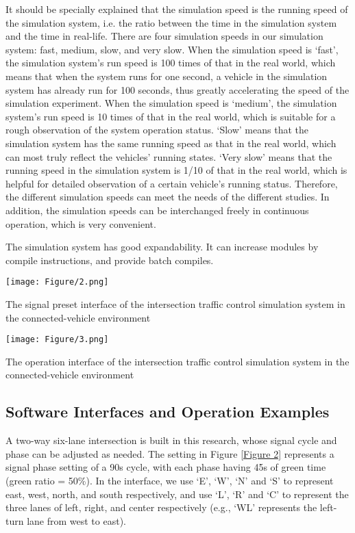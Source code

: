 \documentclass[10.5pt,compsoc]{TsT}
\theoremstyle{mystyle}
\begin{document}
{It should be specially explained that the simulation speed is the
running speed of the simulation system, i.e. the ratio between the time
in the simulation system and the time in real-life. There are four
simulation speeds in our simulation system: fast, medium, slow, and very
slow. When the simulation speed is `fast', the simulation system's run
speed is 100 times of that in the real world, which means that when the
system runs for one second, a vehicle in the simulation system has
already run for 100 seconds, thus greatly accelerating the speed of the
simulation experiment. When the simulation speed is `medium', the
simulation system's run speed is 10 times of that in the real world,
which is suitable for a rough observation of the system operation
status. `Slow' means that the simulation system has the same running
speed as that in the real world, which can most truly reflect the
vehicles' running states. `Very slow' means that the running speed in
the simulation system is 1/10 of that in the real world, which is
helpful for detailed observation of a certain vehicle's running status.
Therefore, the different simulation speeds can meet the needs of the
different studies. In addition, the simulation speeds can be
interchanged freely in continuous operation, which is very convenient.

The simulation system has good expandability. It can increase modules by
compile instructions, and provide batch compiles.
\begin{strip}
\centering
\begin{figurehere}
\centering
\texttt{[image: Figure/2.png]}
\caption{The signal preset interface of the intersection traffic control
simulation system in the connected-vehicle environment}
\label{Figure 2 }
\end{figurehere}
\end{strip}
\begin{strip}
\begin{figurehere}
\centering
\texttt{[image: Figure/3.png]}
\caption{The operation interface of the intersection traffic control
simulation system in the connected-vehicle environment}
\label{Figure 3 }
\end{figurehere}
\end{strip}
\vspace{-2em}
\subsection{Software Interfaces and Operation Examples}
\noindent
A two-way six-lane intersection is built in this research, whose signal
cycle and phase can be adjusted as needed. The setting in Figure \ref{Figure 2}
represents a signal phase setting of a 90s cycle, with each phase having
45s of green time (green ratio = 50\%). In the interface, we use `E',
`W', `N' and `S' to represent east, west, north, and south respectively,
and use `L', `R' and `C' to represent the three lanes of left, right,
and center respectively (e.g., `WL' represents the left-turn lane from
west to east).


}
\end{document}

